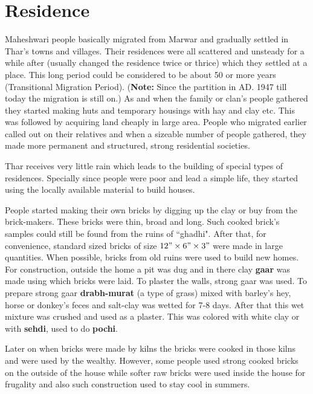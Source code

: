 \section{Residence}
Maheshwari people basically migrated from Marwar and gradually settled in Thar's
towns and villages. Their residences were all scattered and unsteady for a while
after (usually changed the residence twice or thrice) which they settled at a
place. This long period could be considered to be about 50 or more years
(Transitional Migration Period). (\textbf{Note:} Since the partition in AD. 1947
till today the migration is still on.) As and when the family or clan's people
gathered they started making huts and temporary housings with hay and clay etc.
This was followed by acquiring land cheaply in large area. People who migrated
earlier called out on their relatives and when a sizeable number of people
gathered, they made more permanent and structured, strong residential societies.

Thar receives very little rain which leads to the building of special types of
residences. Specially since people were poor and lead a simple life, they
started using the locally available material to build houses.

People started making their own bricks by digging up the clay or buy from the
brick-makers. These bricks were thin, broad and long. Such cooked brick's
samples could still be found from the ruins of ``ghadhi". After that, for
convenience, standard sized bricks of size $12" \times 6" \times 3"$ were made
in large quantities. When possible, bricks from old ruins were used to build new
homes. For construction, outside the home a pit was dug and in there clay
\textbf{gaar} was made using which bricks were laid. To plaster the walls,
strong gaar was used. To prepare strong gaar \textbf{drabh-murat} (a type of
grass) mixed with barley's hey, horse or donkey's feces and salt-clay was wetted
for 7-8 days. After that this wet mixture was crushed and used as a plaster.
This was colored with white clay or with \textbf{sehdi}, used to do
\textbf{pochi}.

Later on when bricks were made by kilns the bricks were cooked in those kilns
and were used by the wealthy. However, some people used strong cooked bricks on
the outside of the house while softer raw bricks were used inside the house for
frugality and also such construction used to stay cool in summers.

